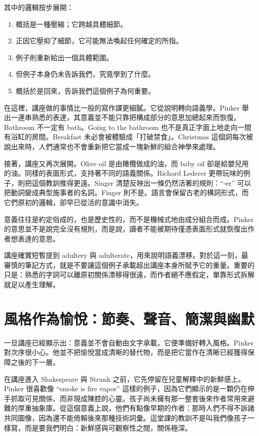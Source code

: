 其中的邏輯按步展開：
\begin{enumerate}
\item 概括是一種壓縮；它跨越具體細節。
\item 正因它壓抑了細節，它可能無法喚起任何確定的所指。
\item 例子則重新給出一個具體範圍。
\item 但例子本身仍未告訴我們，究竟學到了什麼。
\item 概括於是回來，告訴我們這個例子為何重要。
\end{enumerate}

在這裡，講座做的事情比一般的寫作課更細膩。它從說明轉向語義學。Pinker 舉出一連串熟悉的表達，其意義並不能只靠把構成部分的意思加總起來而恢復。Bathroom 不一定有 bath。Going to the bathroom 也不是真正字面上地走向一間有浴缸的房間。Breakfast 未必會被體驗成「打破禁食」。Christmas 這個詞每次被說出來時，人們通常也不會重新把它當成一塊新鮮的組合神學來處理。

接著，講座又再次展開。Olive oil 是由橄欖做成的油，而 baby oil 卻是給嬰兒用的油。同樣的表面形式，支持著不同的語義關係。Richard Lederer 更帶玩味的例子，則把這個教訓推得更遠。Singer 清楚反映出一條仍然活著的規則：``-er'' 可以把動詞變成典型施事者的名詞。Finger 則不是。語言會保留古老的構詞形式，而它們原初的邏輯，卻早已從活的意識中消失。

\begin{remark}
意義往往是約定俗成的，也是歷史性的，而不是機械式地由成分組合而成。Pinker 的意思並不是說完全沒有規則，而是說，讀者不能被期待僅憑表面形式就恢復出作者想表達的意思。
\end{remark}

講座確實短暫提到 adultery 與 adulterate，用來說明語義漂移。對於這一刻，最審慎的筆記方式，就是不要讓這個例子承載超出講座本身所賦予它的重量。重要的只是：熟悉的字詞可以離原初關係漂移得很遠，而作者絕不應假定，單靠形式拆解就足以產生理解。

\section{風格作為愉悅：節奏、聲音、簡潔與幽默}

一旦講座已經顯示出：意義並不會自動由文字承載，它便準備好轉入風格。Pinker 對次序很小心。他並不把愉悅當成清晰的替代物，而是把它當作在清晰已經獲得保障之後的下一層。

在講座進入 Shakespeare 與 Strunk 之前，它先停留在兒童解釋中的新鮮感上。Pinker 很喜歡像 ``smoke is fire vapor'' 這樣的例子，因為它們顯示的是一顆仍在伸手抓取可見關係、而非現成陳腔的心靈。孩子尚未擁有那一整套後來作者常用來避難的厚重抽象庫。從這個意義上說，他們有點像早期的作者：那時人們不得不訴諸共同圖像，因為還不能倚賴後來那種技術詞彙。這堂課的教訓不是叫我們像孩子一樣寫，而是要我們明白：新鮮感與可觀察性之間，關係極深。

